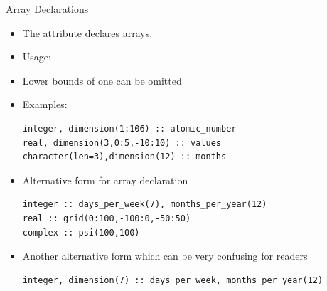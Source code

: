 \documentclass[10pt,t]{beamer}
\begin{document}
\begin{frame}[fragile]{Array Declarations}
  \begin{itemize}
    \item The  attribute declares arrays.
    \item Usage: 
    \item[] Lower bounds of one  can be omitted
    \item Examples:
      \begin{lstlisting}[language={[90]Fortran}]
integer, dimension(1:106) :: atomic_number
real, dimension(3,0:5,-10:10) :: values
character(len=3),dimension(12) :: months
      \end{lstlisting}
    \item Alternative form for array declaration
      \begin{lstlisting}[language={[90]Fortran}]
integer :: days_per_week(7), months_per_year(12)
real :: grid(0:100,-100:0,-50:50)
complex :: psi(100,100)
      \end{lstlisting}
    \item Another alternative form which can be very confusing for readers
      \begin{lstlisting}[language={[90]Fortran}]
integer, dimension(7) :: days_per_week, months_per_year(12)
      \end{lstlisting}
  \end{itemize}
\end{frame}
\end{document}
